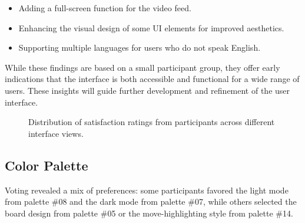 \begin{itemize}
    \item Adding a full-screen function for the video feed.
    \item Enhancing the visual design of some UI elements for improved aesthetics.
    \item Supporting multiple languages for users who do not speak English.
\end{itemize}

While these findings are based on a small participant group, they offer early indications that the interface is both accessible and functional for a wide range of users. These insights will guide further development and refinement of the user interface.

\begin{figure}[htbp]
\centering
{}
\caption{Distribution of satisfaction ratings from participants across different interface views.}
\label{fig:wireframe-test-results}
\end{figure}



\subsection{Color Palette}
\label{subsec:results-color-palette}
Voting revealed a mix of preferences: some participants favored the light mode from palette \#08 and the dark mode from palette \#07, while others selected the board design from palette \#05 or the move-highlighting style from palette \#14. \\


